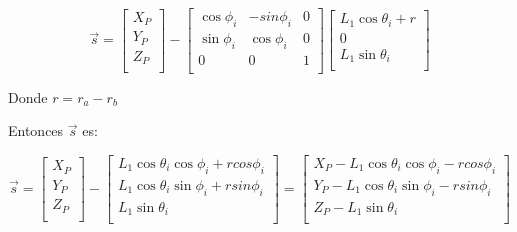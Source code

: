                  \[ \overrightarrow{s}= \left[ \begin{matrix}
                X_{P}\\
                Y_{P}\\
                Z_{P}\\
                \end{matrix}
                 \right] - \left[ \begin{matrix}
                \cos  \phi _{i}  &  -sin \phi _{i}  &  0\\
                \sin  \phi _{i}  &  \cos  \phi _{i}  &  0\\
                0  &  0  &  1\\
                \end{matrix}
                 \right]  \left[ \begin{matrix}
                L_{1}\cos  \theta _{i}+ r\\
                0\\
                L_{1}\sin  \theta _{i}\\
                \end{matrix}
                 \right]  \] 
                
                Donde  \( r=r_{a}-r_{b} \)
                
                Entonces $\overrightarrow{s}$ es:  

                 \[ \overrightarrow{s}= \left[ \begin{matrix}
                X_{P}\\
                Y_{P}\\
                Z_{P}\\
                \end{matrix}
                 \right] - \left[ \begin{matrix}
                L_{1}\cos  \theta _{i}\cos  \phi _{i}+ rcos \phi _{i}\\
                L_{1}\cos  \theta _{i}\sin  \phi _{i}+ rsin \phi _{i}\\
                L_{1}\sin  \theta _{i}\\
                \end{matrix}
                 \right]  = \left[ \begin{matrix}
                X_{P}-L_{1}\cos  \theta _{i}\cos  \phi _{i}- rcos \phi _{i}\\
                Y_{P}-L_{1}\cos  \theta _{i}\sin  \phi _{i}- rsin \phi _{i}\\
                Z_{P}-L_{1}\sin  \theta _{i}\\
                \end{matrix}
                 \right]  \] \

